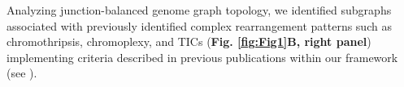 \documentclass[phd,tocprelim]{cornell}
\begin{document}
Analyzing junction-balanced genome graph topology, we identified subgraphs associated with previously identified complex rearrangement patterns such as chromothripsis, chromoplexy, and TICs (\textbf{Fig. \ref{fig:Fig1}B, right panel}) implementing criteria described in previous publications within our framework (see ). 



\end{document}
